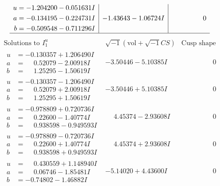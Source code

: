 \documentclass[1p]{elsarticle_modified}
\theoremstyle{definition}
\newcommand{\I}{\sqrt{-1}}
\begin{document}
$$\begin{array}{c|c|c}
\begin{aligned}
u &= -1.204200 - 0.051631 I \\
a &= -0.134195 - 0.224731 I \\
b &= -0.509548 - 0.711296 I\end{aligned}
 & -1.43643 - 1.06724 I & \phantom{-0.000000 } 0\\
 \hline 
 \end{array}$$\newpage$$\begin{array}{c|c|c}  
\text{Solutions to }I^u_{1}& \I (\text{vol} + \sqrt{-1}CS) & \text{Cusp shape}\\
 \hline 
\begin{aligned}
u &= -0.130357 + 1.206490 I \\
a &= \phantom{-}0.52079 - 2.00918 I \\
b &= \phantom{-}1.25295 - 1.50619 I\end{aligned}
 & -3.50446 - 5.10385 I & \phantom{-0.000000 } 0 \\ \hline\begin{aligned}
u &= -0.130357 - 1.206490 I \\
a &= \phantom{-}0.52079 + 2.00918 I \\
b &= \phantom{-}1.25295 + 1.50619 I\end{aligned}
 & -3.50446 + 5.10385 I & \phantom{-0.000000 } 0 \\ \hline\begin{aligned}
u &= -0.978809 + 0.720736 I \\
a &= \phantom{-}0.22600 - 1.40774 I \\
b &= \phantom{-}0.938598 - 0.949593 I\end{aligned}
 & \phantom{-}4.45374 - 2.93608 I & \phantom{-0.000000 } 0 \\ \hline\begin{aligned}
u &= -0.978809 - 0.720736 I \\
a &= \phantom{-}0.22600 + 1.40774 I \\
b &= \phantom{-}0.938598 + 0.949593 I\end{aligned}
 & \phantom{-}4.45374 + 2.93608 I & \phantom{-0.000000 } 0 \\ \hline\begin{aligned}
u &= \phantom{-}0.430559 + 1.148940 I \\
a &= \phantom{-}0.06746 - 1.85481 I \\
b &= -0.74802 - 1.46882 I\end{aligned}
 & -5.14020 + 4.43600 I & \phantom{-0.000000 } 0 \\ \hline\begin{aligned}

\end{aligned}
\end{array}$$
\end{document}
